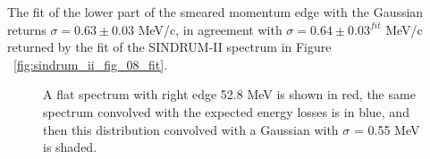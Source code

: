 The fit of the lower part of the smeared momentum edge with the Gaussian returns
$\sigma = 0.63 \pm 0.03$ MeV/c, in agreement with $\sigma = 0.64 \pm 0.03^{fit}$ MeV/c
returned by the fit of the SINDRUM-II spectrum in Figure ~\ref{fig:sindrum_ii_fig_08_fit}.

\begin{figure} 
\caption{
  \label{fig:sindrum_ii_michel_calibration}
  A flat spectrum with right edge 52.8 MeV is shown in red, the same spectrum convolved with 
  the expected energy losses is in blue, and then this distribution convolved with
  a Gaussian with $\sigma$ = 0.55 MeV is shaded.
}
\end{figure}


